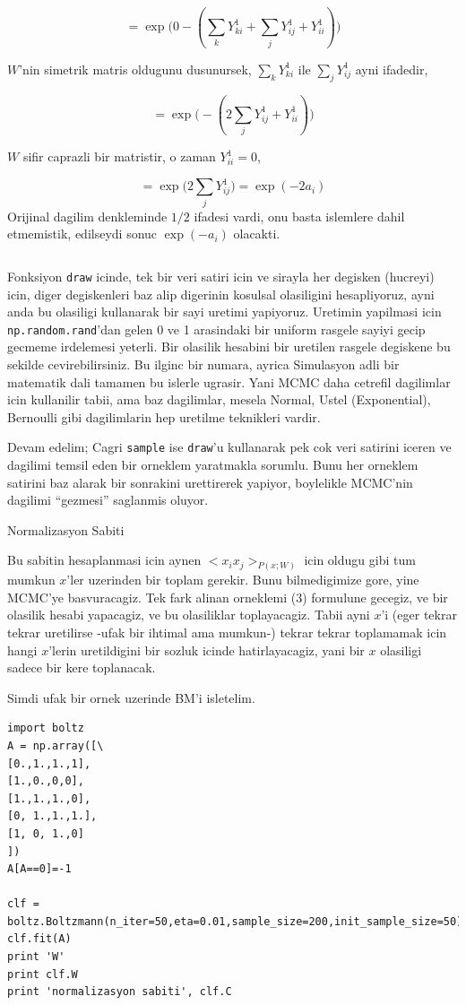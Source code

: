 \documentclass[12pt,fleqn]{article}\usepackage{../common}
\begin{document}
$$ 
= \exp \big( 
0 - ( \sum_{k}  Y_{ki}^1 + \sum_{j} Y_{ij}^1 + Y_{ii}^1  ) 
\big)
 $$

$W$'nin simetrik matris oldugunu dusunursek, $\sum_{k}  Y_{ki}^1$ ile $\sum_{j}Y_{ij}^1$ ayni ifadedir, 

$$ 
= \exp \big( 
- ( 2 \sum_{j} Y_{ij}^1 + Y_{ii}^1  ) 
\big)
 $$

$W$ sifir caprazli bir matristir, o zaman $Y_{ii}^1=0$, 

$$ 
= \exp \big( 2 \sum_{j} Y_{ij}^1 \big) = \exp (- 2 a_i )
 $$
Orijinal dagilim denkleminde $1/2$ ifadesi vardi, onu basta islemlere dahil
etmemistik, edilseydi sonuc  $\exp (- a_i)$ olacakti. 

\inputminted[fontsize=\footnotesize]{python}{boltz.py}

Fonksiyon \verb!draw! icinde, tek bir veri satiri icin ve sirayla her
degisken (hucreyi) icin, diger degiskenleri baz alip digerinin kosulsal
olasiligini hesapliyoruz, ayni anda bu olasiligi kullanarak bir sayi
uretimi yapiyoruz. Uretimin yapilmasi icin \verb!np.random.rand!'dan gelen
0 ve 1 arasindaki bir uniform rasgele sayiyi gecip gecmeme irdelemesi
yeterli. Bir olasilik hesabini bir uretilen rasgele degiskene bu sekilde
cevirebilirsiniz. Bu ilginc bir numara, ayrica Simulasyon adli bir
matematik dali tamamen bu islerle ugrasir. Yani MCMC daha cetrefil
dagilimlar icin kullanilir tabii, ama baz dagilimlar, mesela Normal, Ustel
(Exponential), Bernoulli gibi dagilimlarin hep uretilme teknikleri vardir.

Devam edelim; Cagri \verb!sample! ise \verb!draw!'u kullanarak pek cok veri
satirini iceren ve dagilimi temsil eden bir orneklem yaratmakla
sorumlu. Bunu her orneklem satirini baz alarak bir sonrakini urettirerek
yapiyor, boylelikle MCMC'nin dagilimi ``gezmesi'' saglanmis oluyor.

Normalizasyon Sabiti

Bu sabitin hesaplanmasi icin aynen $<x_ix_j>_{P(x;W)}$ icin oldugu gibi tum
mumkun $x$'ler uzerinden bir toplam gerekir. Bunu bilmedigimize gore, yine
MCMC'ye basvuracagiz. Tek fark alinan orneklemi (3) formulune gecegiz, ve
bir olasilik hesabi yapacagiz, ve bu olasiliklar toplayacagiz. Tabii ayni
$x$'i (eger tekrar tekrar uretilirse -ufak bir ihtimal ama mumkun-) tekrar
tekrar toplamamak icin hangi $x$'lerin uretildigini bir sozluk icinde
hatirlayacagiz, yani bir $x$ olasiligi sadece bir kere toplanacak. 

Simdi ufak bir ornek uzerinde BM'i isletelim. 

\begin{verbatim}
import boltz
A = np.array([\
[0.,1.,1.,1],
[1.,0.,0,0],
[1.,1.,1.,0],
[0, 1.,1.,1.],
[1, 0, 1.,0]
])
A[A==0]=-1

clf = boltz.Boltzmann(n_iter=50,eta=0.01,sample_size=200,init_sample_size=50)
clf.fit(A)
print 'W'
print clf.W
print 'normalizasyon sabiti', clf.C
\end{verbatim}
\end{document}
